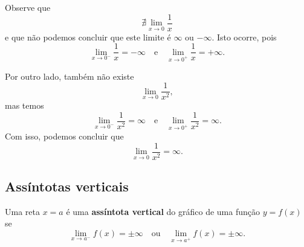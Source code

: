 \begin{ex}
  Observe que
  \begin{equation}
    \nexists \lim_{x\to 0} \frac{1}{x}
  \end{equation}
  e que não podemos concluir que este limite é $\infty$ ou $-\infty$. Isto ocorre, pois
  \begin{equation}
    \lim_{x\to 0^-} \frac{1}{x} = -\infty\quad\text{e}\quad\lim_{x\to 0^+} \frac{1}{x} = +\infty.
  \end{equation}

  Por outro lado, também não existe
  \begin{equation}
    \lim_{x\to 0} \frac{1}{x^2},
  \end{equation}
  mas temos
  \begin{equation}
    \lim_{x\to 0^-} \frac{1}{x^2} = \infty\quad\text{e}\quad\lim_{x\to 0^+} \frac{1}{x^2} = \infty.
  \end{equation}
  Com isso, podemos concluir que
  \begin{equation}
    \lim_{x\to 0} \frac{1}{x^2} = \infty.
  \end{equation}
\end{ex}

\subsection{Assíntotas verticais}

Uma reta $x=a$ é uma {\bf assíntota vertical} do gráfico de uma função $y = f(x)$ se
\begin{equation}
  \lim_{x\to a^-} f(x) = \pm\infty\quad\text{ou}\quad\lim_{x\to a^+} f(x) = \pm\infty.
\end{equation}

